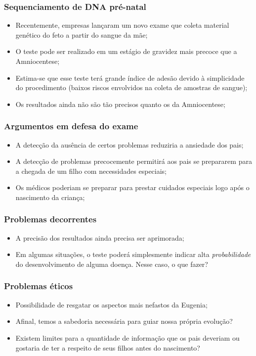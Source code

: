 \documentclass{beamer}
\begin{document}
\begin{frame}
\frametitle{Sequenciamento de DNA pré-natal}
\begin{itemize}
\item Recentemente, empresas lançaram um novo exame que coleta material genético do feto a partir do sangue da mãe;
\item O teste pode ser realizado em um estágio de gravidez mais precoce que a Amniocentese;
\item Estima-se que esse teste terá grande índice de adesão devido à simplicidade do procedimento (baixos riscos envolvidos na coleta de amostras de sangue);
\item Os resultados ainda não são tão precisos quanto os da Amniocentese;
\end{itemize}
\end{frame}

\begin{frame}
\frametitle{Argumentos em defesa do exame}
\begin{itemize}
\item A detecção da ausência de certos problemas reduziria a ansiedade dos pais;
\item A detecção de problemas precocemente permitirá aos pais se prepararem para a chegada de um filho com necessidades especiais;
\item Os médicos poderiam se preparar para prestar cuidados especiais logo após o nascimento da criança;
\end{itemize}
\end{frame}

\begin{frame}
\frametitle{Problemas decorrentes}
\begin{itemize}
\item A precisão dos resultados ainda precisa ser aprimorada;
\item Em algumas situações, o teste poderá simplesmente indicar alta \emph{probabilidade} do desenvolvimento de alguma doença. Nesse caso, o que fazer?
\end{itemize}
\end{frame}

\begin{frame}
\frametitle{Problemas éticos}
\begin{itemize}
\item Possibilidade de resgatar os aspectos mais nefastos da Eugenia;
\item Afinal, temos a sabedoria necessária para guiar nossa própria evolução?
\item Existem limites para a quantidade de informação que os pais deveriam ou gostaria de ter a respeito de seus filhos antes do nascimento?
\end{itemize}
\end{frame}
\end{document}
